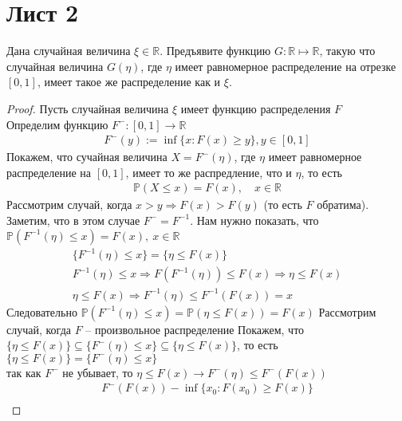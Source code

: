 \section{Лист 2}
    \begin{prob}
        Дана случайная величина $\xi \in \mathbb{R}$. Предъявите функцию $G: \mathbb{R} \mapsto \mathbb{R}$, такую что случайная величина $G(\eta)$, где $\eta$ имеет равномерное распределение на отрезке $[0,1]$, имеет такое же распределение как и $\xi$.
    \end{prob}
    \begin{proof}
        Пусть случайная величина $\xi$ имеет функцию распределения $F$\\
        Определим функцию $F^{-}: [0,1] \to \mathbb{R}$
        \begin{gather*}
            F^{-} (y) := \inf \{x: F(x) \geqslant y\}, y \in [0,1]
        \end{gather*}
        Покажем, что сучайная величина $X = F^{-}(\eta)$, где $\eta$ имеет равномерное распределение на $[0,1]$, имеет то же распредление, что и $\eta$, то есть
        \begin{gather*}
            \mathbb{P} (X \leqslant x) = F(x),\quad x \in \mathbb{R}
        \end{gather*}
        Рассмотрим случай, когда $x > y \Rightarrow F(x) > F(y)$ (то есть $F$ обратима). Заметим, что в этом случае $F^{-} = F^{-1}$. Нам нужно показать, что $\mathbb{P}(F^{-1}(\eta) \leqslant x) = F(x),\ x \in \mathbb{R}$
        \begin{gather*}
            \{F^{-1}(\eta) \leqslant x\} = \{\eta \leqslant F(x)\}\\
            F^{-1} (\eta) \leqslant x \Rightarrow F(F^{-1}(\eta)) \leqslant F(x) \Rightarrow \eta \leqslant F(x)\\
            \eta \leqslant F(x) \Rightarrow F^{-1}(\eta) \leqslant F^{-1}(F(x)) = x
        \end{gather*}
        Следовательно $\mathbb{P}(F^{-1} (\eta) \leqslant x) = \mathbb{P}(\eta \leqslant F(x)) = F(x)$
        \vskip 0.2in
        Рассмотрим случай, когда $F$ -- произвольное распределение
        Покажем, что $\{\eta \leqslant F(x)\} \subseteq \{F^{-}(\eta) \leqslant x\} \subseteq \{\eta \leqslant F(x)\}$, то есть $\{\eta \leqslant F(x)\} = \{F^{-} (\eta) \leqslant x\}$\\
        так как $F^{-}$ не убывает, то $\eta \leqslant F(x) \to F^{-}(\eta) \leqslant F^{-}(F(x))$
        \begin{gather*}
            F^{-}(F(x)) - \inf \{x_{0}: F(x_0) \geqslant F(x)\}\\

\end{gather*}
\end{proof}
